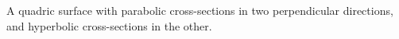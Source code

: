  A quadric surface with parabolic cross-sections in two perpendicular
directions, and hyperbolic cross-sections in the other.
